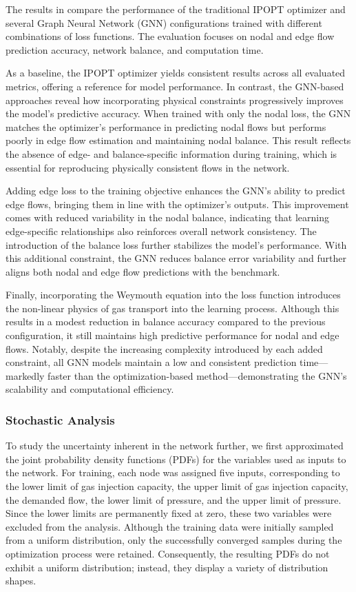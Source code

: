 The results in  compare the performance of the traditional IPOPT optimizer and several Graph Neural Network (GNN) configurations trained with different combinations of loss functions. The evaluation focuses on nodal and edge flow prediction accuracy, network balance, and computation time.

As a baseline, the IPOPT optimizer yields consistent results across all evaluated metrics, offering a reference for model performance. In contrast, the GNN-based approaches reveal how incorporating physical constraints progressively improves the model's predictive accuracy. When trained with only the nodal loss, the GNN matches the optimizer's performance in predicting nodal flows but performs poorly in edge flow estimation and maintaining nodal balance. This result reflects the absence of edge- and balance-specific information during training, which is essential for reproducing physically consistent flows in the network.

Adding edge loss to the training objective enhances the GNN’s ability to predict edge flows, bringing them in line with the optimizer’s outputs. This improvement comes with reduced variability in the nodal balance, indicating that learning edge-specific relationships also reinforces overall network consistency. The introduction of the balance loss further stabilizes the model’s performance. With this additional constraint, the GNN reduces balance error variability and further aligns both nodal and edge flow predictions with the benchmark.

Finally, incorporating the Weymouth equation into the loss function introduces the non-linear physics of gas transport into the learning process. Although this results in a modest reduction in balance accuracy compared to the previous configuration, it still maintains high predictive performance for nodal and edge flows. Notably, despite the increasing complexity introduced by each added constraint, all GNN models maintain a low and consistent prediction time—markedly faster than the optimization-based method—demonstrating the GNN’s scalability and computational efficiency.


\subsubsection{Stochastic Analysis}

To study the uncertainty inherent in the network further, we first approximated the joint probability density functions (PDFs) for the variables used as inputs to the network. For training, each node was assigned five inputs, corresponding to the lower limit of gas injection capacity, the upper limit of gas injection capacity, the demanded flow, the lower limit of pressure, and the upper limit of pressure. Since the lower limits are permanently fixed at zero, these two variables were excluded from the analysis. Although the training data were initially sampled from a uniform distribution, only the successfully converged samples during the optimization process were retained. Consequently, the resulting PDFs do not exhibit a uniform distribution; instead, they display a variety of distribution shapes.

